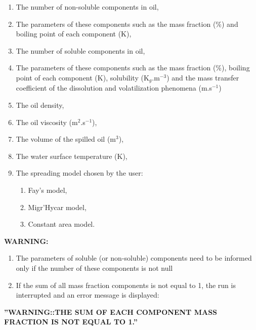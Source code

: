 \begin{enumerate}
\item  The number of non-soluble components in oil,

\item  The parameters of these components such as the mass fraction (\%) and boiling point of each component (K),

\item  The number of soluble components in oil,

\item  The parameters of these components such as the mass fraction (\%), boiling point of each component (K), solubility (K${}_{g}$.m${}^{-3}$) and the mass transfer coefficient of the dissolution and volatilization phenomena (m.s${}^{-1}$)

\item  The oil density,

\item  The oil viscosity (m${}^{2}$.s${}^{-1}$),

\item  The volume of the spilled oil (m${}^{3}$),

\item  The water surface temperature (K),

\item  The spreading model chosen by the user:

\begin{enumerate}
\item  Fay's model,

\item  Migr'Hycar model,

\item  Constant area model.
\end{enumerate}
\end{enumerate}

 \textbf{WARNING:}

\begin{enumerate}
\item \textbf{ }The parameters of soluble (or non-soluble) components need to be informed only if the number of these components is not null

\item  If the sum of all mass fraction components is not equal to 1, the run is interrupted and an error message is displayed:
\end{enumerate}

 \textbf{''WARNING::THE SUM OF EACH COMPONENT MASS FRACTION IS NOT EQUAL TO 1.''}

